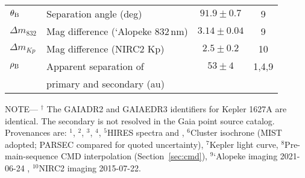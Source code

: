 \begin{table*}
\begin{tabular}{llcc}
$\theta_{\rm B}$ & Separation angle (deg)\dotfill & $91.9 \pm 0.7$ & 9 \\
$\Delta m_{832}$ & Mag difference (`Alopeke 832\,nm)\dotfill & $3.14 \pm 0.04$ & 9 \\
$\Delta m_{Kp}$ & Mag difference (NIRC2 Kp)\dotfill & $2.5 \pm 0.2$ & 10 \\
$\rho_{\rm B}$ & Apparent separation of \dotfill & $53 \pm 4$ &  1,4,9 \\
                    & \hspace{3pt} primary and secondary (au) &  \\
\hline
\end{tabular}
\begin{flushleft}
 \footnotesize{ \textsc{NOTE}---
 $^\dagger$ The GAIADR2 and GAIAEDR3 identifiers for Kepler 1627A are identical.  The secondary
 is not resolved in the Gaia point source catalog.
Provenances are:
$^1$\citet{gaia_collaboration_gaia_2018},
$^2$\citet{stassun_TIC8_2019},
$^3$\citet{skrutskie_tmass_2006},
$^4$\citet{Lindegren_2021_offset},
$^5$HIRES spectra and \citet{yee_SM_2017},
$^6$Cluster isochrone (MIST adopted; PARSEC compared for quoted
  uncertainty),
$^7$Kepler light curve,
$^8$Pre-main-sequence CMD interpolation (Section~\ref{sec:cmd}),
$^9$`Alopeke imaging 2021-06-24 \citep{scott_twin_2021},
$^{10}$NIRC2 imaging 2015-07-22.
}
\end{flushleft}
\vspace{-0.5cm}
\end{table*}

